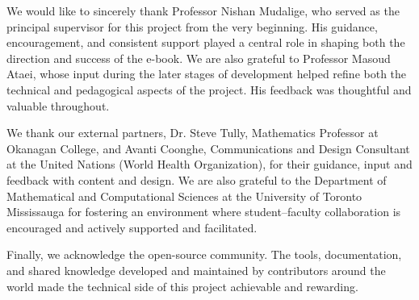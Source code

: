 \documentclass[11pt]{article}
\begin{document}
\begin{acknowledgments}
We would like to sincerely thank Professor Nishan Mudalige, who served as the principal supervisor for this project from the very beginning. His guidance, encouragement, and consistent support played a central role in shaping both the direction and success of the e-book.
We are also grateful to Professor Masoud Ataei, whose input during the later stages of development helped refine both the technical and pedagogical aspects of the project. His feedback was thoughtful and valuable throughout.

We thank our external partners, Dr. Steve Tully, Mathematics Professor at Okanagan College, and Avanti Coonghe, Communications and Design Consultant at the United Nations (World Health Organization), for their guidance, input and feedback with content and design.
We are also grateful to the Department of Mathematical and Computational Sciences at the University of Toronto Mississauga for fostering an environment where student–faculty collaboration is encouraged and actively supported and facilitated.

Finally, we acknowledge the open-source community. The tools, documentation, and shared knowledge developed and maintained by contributors around the world made the technical side of this project achievable and rewarding.
\end{acknowledgments}

\printbibliography[title={REFERENCES},heading=bibintoc]
\end{document}

